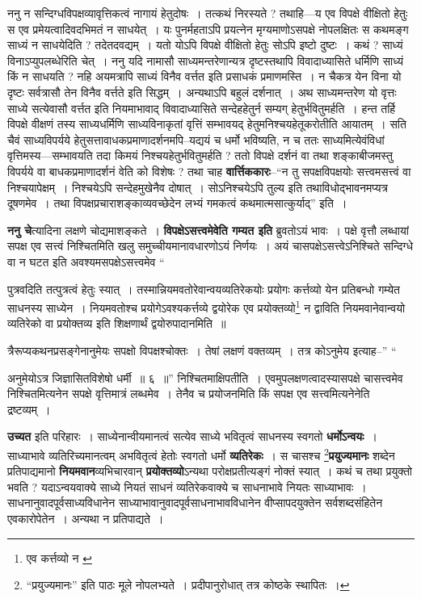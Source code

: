 \documentclass[article,12pt,a4paper]{memoir}
\begin{document}
	  \pstart ननु न सन्दिग्धविपक्षव्यावृत्तिकत्वं नागायं हेतुदोषः । तत्कथं निरस्यते ? तथाहि—य एव विपक्षे वीक्षितो हेतुः स एव प्रमेयत्वादिवदभिमतं न साधयेत् । यः पुनर्महताऽपि प्रयत्नेन मृग्यमाणोऽसपक्षे नोपलक्षितः स कथमङ्ग साध्यं न साधयेदिति ? तदेतदवद्यम् । यतो योऽपि विपक्षे वीक्षितो हेतुः सोऽपि इष्टो दुष्टः । कथं ? साध्यं विनाऽप्युपलब्धेरिति चेत् । ननु यदि नामासौ साध्यमन्तरेणान्यत्र दृष्टस्तथापि विवादाध्यासिते धर्मिणि साध्यं किं न साधयति ? नहि अयमत्रापि साध्यं विनैव वर्त्तत इति प्रसाधकं प्रमाणमस्ति । न चैकत्र येन विना यो दृष्टः सर्वत्रासौ तेन विनैव वर्त्तते इति सिद्धम् । अन्यथाऽपि बहुलं दर्शनात् । अथ साध्यमन्तरेण यो वृत्तः साध्ये सत्येवासौ वर्त्तत इति नियमाभावाद् विवादाध्यासिते सन्देहहेतुर्न सम्यग् हेतुर्भवितुमर्हति । हन्त तर्हि विपक्षे वीक्षणं तस्य साध्यधर्मिणि साध्यविनाकृतां वृत्तिं सम्भावयद् हेतुमनिश्चयहेतूकरोतीति आयातम् । सति चैवं साध्यविपर्यये हेतुसत्तावाधकप्रमाणादर्शनमपि--यद्ययं च धर्मो भविष्यति, न च ततः साध्यमित्येवंविधां वृत्तिमस्य—सम्भावयति तदा किमयं निश्चयहेतुर्भवितुमर्हति ? ततो वि\leavevmode{}पक्षे दर्शनं वा तथा शङ्काबीजमस्तु विपर्यये वा बाधकप्रमाणादर्शनं वेति को विशेषः ? तथा चाह \textbf{वार्त्तिककारः}--“न तु सपक्षविपक्षयोः सत्त्वमसत्त्वं वा निश्चयापेक्षम् । निश्चयेऽपि सन्देहमुखेनैव दोषात् । सोऽनिश्चयेऽपि तुल्य इति तथाविधोद्भावनमप्यत्र दूषणमेव । तथा विपक्षप्रचाराशङ्काव्यवच्छेदेन लभ्यं गमकत्वं कथमात्मसात्कुर्याद्” इति ।
	\pend
      

	  \pstart \textbf{ननु चे}त्यादिना लक्षणे चोद्यमाशङ्कते । \textbf{विपक्षेऽसत्त्वमेवेति गम्यत इति} ब्रुवतोऽयं भावः । पक्षे वृत्तौ लब्धायां सपक्ष एव सत्त्वं निश्चितमिति खलु समुच्चीयमानावधारणोऽयं निर्णयः । अयं चासपक्षेऽसत्त्वेऽनिश्चिते सन्दिग्धे वा न घटत इति अवश्यमसपक्षेऽसत्त्वमेव    \leavevmode{} “
	  
	पुत्रवदिति तत्पुत्रत्वं हेतुः स्यात् । तस्मान्नियमवतोरेवान्वयव्यतिरेकयोः प्रयोगः कर्त्तव्यो येन प्रतिबन्धो गम्येत साधनस्य साध्येन । नियमवतोश्च प्रयोगेऽवश्यकर्त्तव्ये द्वयोरेक एव प्रयोक्तव्यो\footnote{एव कर्त्तव्यो न \cite{dp-msA}} न द्वाविति नियमवानेवान्वयो व्यतिरेको वा प्रयोक्तव्य इति शिक्षणार्थं द्वयोरुपादानमिति ॥ 
	  
	त्रैरूप्यकथनप्रसङ्गेनानुमेयः सपक्षो विपक्षश्चोक्तः । तेषां लक्षणं वक्तव्यम् । तत्र कोऽनुमेय इत्याह--” “
	  
	अनुमेयोऽत्र जिज्ञासितविशेषो धर्मी ॥ ६ ॥” निश्चितमाक्षिपतीति । एवमुपलक्षणत्वादस्यासपक्षे चासत्त्वमेव निश्चितमित्यनेन सपक्षे वृत्तिमात्रं लब्धमेव । तेनैव च प्रयोजनमिति किं सपक्ष एव सत्त्वमित्यनेनेति द्रष्टव्यम् ।
	\pend
      

	  \pstart \textbf{उच्यत} इति परिहारः । साध्येनान्वीयमानत्वं सत्येव साध्ये भवितृत्वं साधनस्य स्वगतो \textbf{धर्मोऽन्वयः} । साध्याभावे व्यतिरिच्यमानत्वम् अभवितृत्वं हेतोः स्वगतो धर्मो \textbf{व्यतिरेकः} । स चासश्च \footnote{“प्रयुज्यमानः” इति पाठः मूले नोपलभ्यते । प्रदीपानुरोधात् तत्र कोष्ठके स्थापितः ।}\textbf{प्रयुज्यमानः} शब्देन प्रतिपाद्यमानो \textbf{नियमवान}व्यभिचारवान् \textbf{प्रयोक्तव्यो}ऽन्यथा परोक्षप्रतीत्यङ्गं नोक्तं स्यात् । कथं च तथा प्रयुक्तो भवति ? यदाऽन्वयवाक्ये साध्ये नियतं साधनं व्यतिरेकवाक्ये च साधनाभावे नियतः साध्याभावः । साधनानुवादपूर्वसाध्यविधानेन साध्याभावानुवादपूर्वसाधनाभावविधानेन वीप्सापदयुक्तेन सर्वशब्दसंहितेन एवकारोपेतेन । अन्यथा न प्रतिपाद्यते ।
	\pend
      
\end{document}

